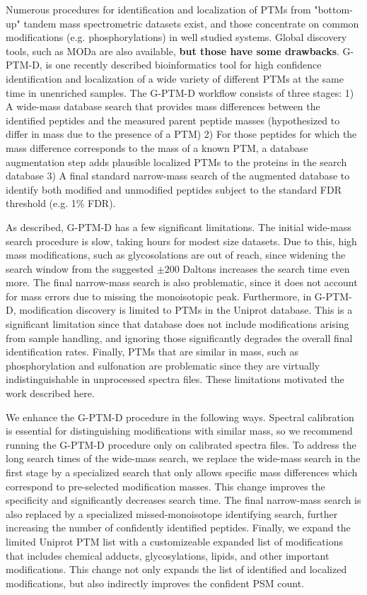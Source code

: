 \documentclass[journal=jprobs,manuscript=article]{achemso}
\begin{document}
Numerous procedures for identification and localization of PTMs from "bottom-up" tandem mass spectrometric datasets exist, and those concentrate on common modifications (e.g. phosphorylations) in well studied systems.
Global discovery tools, such as MODa\cite{Na_2011} are also available, \textbf{but those have some drawbacks}.
G-PTM-D\cite{Li_2016}, is one recently described bioinformatics tool for high confidence identification and localization of a wide variety of different PTMs at the same time in unenriched samples.
The G-PTM-D workflow consists of three stages: 1) A wide-mass database search\cite{Chick_2015, Na_2011} that provides mass differences between the identified peptides and the measured parent peptide masses (hypothesized to differ in mass due to the presence of a PTM)
2) For those peptides for which the mass difference corresponds to the mass of a known PTM, a database augmentation step adds plausible localized PTMs to the proteins in the search database
3) A final standard narrow-mass search of the augmented database to identify both modified and unmodified peptides subject to the standard FDR threshold (e.g. 1\% FDR).

As described, G-PTM-D has a few significant limitations.
The initial wide-mass search procedure is slow, taking hours for modest size datasets.
Due to this, high mass modifications, such as glycosolations are out of reach, since widening the search window from the suggested $\pm 200$ Daltons increases the search time even more.
The final narrow-mass search is also problematic, since it does not account for mass errors due to missing the monoisotopic peak.
Furthermore, in G-PTM-D, modification discovery is limited to PTMs in the Uniprot database.
This is a significant limitation since that database does not include modifications arising from sample handling, and ignoring those significantly degrades the overall final identification rates.
Finally, PTMs that are similar in mass, such as phosphorylation and sulfonation are problematic since they are virtually indistinguishable in unprocessed spectra files.
These limitations motivated the work described here.

We enhance the G-PTM-D procedure in the following ways.
Spectral calibration is essential for distinguishing modifications with similar mass, so we recommend running the G-PTM-D procedure only on calibrated spectra files.
To address the long search times of the wide-mass search, we replace the wide-mass search in the first stage by a specialized search that only allows specific mass differences which correspond to pre-selected modification masses.
This change improves the specificity and significantly decreases search time.
The final narrow-mass search is also replaced by a specialized missed-monoisotope identifying search, further increasing the number of confidently identified peptides.
Finally, we expand the limited Uniprot PTM list with a customizeable expanded list of modifications that includes chemical adducts, glycosylations, lipids, and other important modifications.
This change not only expands the list of identified and localized modifications, but also indirectly improves the confident PSM count. 
\end{document}
